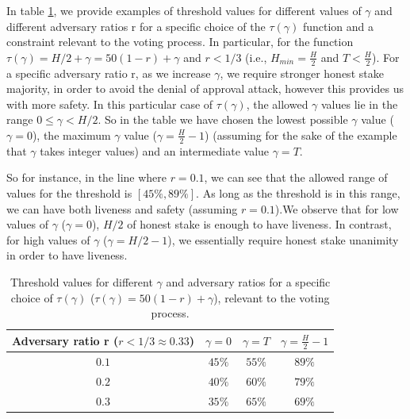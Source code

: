 In table \ref{table:examples}, we provide examples of threshold 
values for different values of $\gamma$ and different adversary ratios r for a 
specific choice of the $\tau(\gamma)$ function and a constraint relevant to the 
voting process. In particular, for the function $\tau(\gamma) = H/2 + \gamma = 
50(1-r)+\gamma$ and $r < 1/3$ (i.e., $H_{min} = 
\frac{H}{2}$ and $T < \frac{H}{2}$). For a specific adversary ratio r, as we 
increase $\gamma$, we 
require stronger honest stake majority, in order to avoid the denial of 
approval attack, however this provides us with more safety. In this particular 
case of $\tau(\gamma)$, the 
allowed $\gamma$ values lie in the range $0 \leq \gamma < H/2$.  So in the 
table 
we have chosen the lowest possible $\gamma$ value ($\gamma=0$), the maximum 
$\gamma$ value ($\gamma = \frac{H}{2} - 1$) (assuming for the sake of the 
example that $\gamma$ takes integer values) and an intermediate value $\gamma = 
T$.

So for instance, in the line where $r=0.1$, we can see that the allowed range 
of values for the threshold is $[45\%, 89\%]$. As long as the threshold is 
in this range, we can have both liveness and safety (assuming $r=0.1$).We 
observe that for low values of $\gamma$ ($\gamma = 0$), $H/2$ of honest stake 
is 
enough to have liveness. In contrast, for high values of $\gamma$ ($\gamma = 
H/2 -1$), we essentially require honest stake unanimity in order to have 
liveness.

\begin{table}[h!]
	\centering
	\begin{tabular}{ | c | c | c | c |} 
		\hline
		Adversary ratio r ($r < 1/3 \approx 0.33$) & $\gamma = 0$ & $\gamma = 
		T$ & $\gamma = \frac{H}{2} - 1$ \\ 
		\hline
		$0.1$ & $45\%$ & $55\%$ & $89\%$ \\ 
		$0.2$ & $40\%$ & $60\%$ & $79\%$ \\ 
		$0.3$ & $35\%$ & $65\%$ & $69\%$ \\ 
		\hline
	\end{tabular}
	\caption{Threshold values for different $\gamma$ and adversary 
		ratios for a specific choice of $\tau(\gamma)$ ($\tau(\gamma) = 
		50(1-r)+\gamma$), relevant to the voting 
		process.}
	\label{table:examples}
\end{table}

